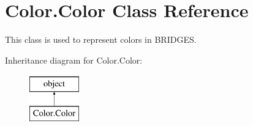 \hypertarget{class_color_1_1_color}{}\section{Color.\+Color Class Reference}
\label{class_color_1_1_color}


This class is used to represent colors in B\+R\+I\+D\+G\+ES.  


Inheritance diagram for Color.\+Color\+:\begin{figure}[H]
\begin{center}
\leavevmode
\includegraphics[height=2.000000cm]{class_color_1_1_color}
\end{center}
\end{figure}
